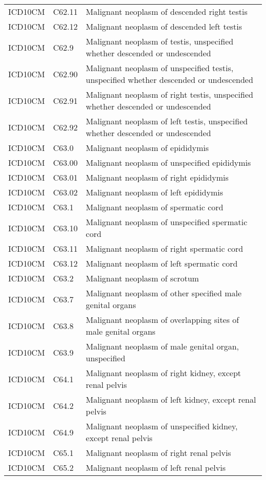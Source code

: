 \begin{longtable}{p{}p{}p{}}
  ICD10CM & C62.11 & Malignant neoplasm of descended right testis \\ 
  ICD10CM & C62.12 & Malignant neoplasm of descended left testis \\ 
  ICD10CM & C62.9 & Malignant neoplasm of testis, unspecified whether descended or undescended \\ 
  ICD10CM & C62.90 & Malignant neoplasm of unspecified testis, unspecified whether descended or undescended \\ 
  ICD10CM & C62.91 & Malignant neoplasm of right testis, unspecified whether descended or undescended \\ 
  ICD10CM & C62.92 & Malignant neoplasm of left testis, unspecified whether descended or undescended \\ 
  ICD10CM & C63.0 & Malignant neoplasm of epididymis \\ 
  ICD10CM & C63.00 & Malignant neoplasm of unspecified epididymis \\ 
  ICD10CM & C63.01 & Malignant neoplasm of right epididymis \\ 
  ICD10CM & C63.02 & Malignant neoplasm of left epididymis \\ 
  ICD10CM & C63.1 & Malignant neoplasm of spermatic cord \\ 
  ICD10CM & C63.10 & Malignant neoplasm of unspecified spermatic cord \\ 
  ICD10CM & C63.11 & Malignant neoplasm of right spermatic cord \\ 
  ICD10CM & C63.12 & Malignant neoplasm of left spermatic cord \\ 
  ICD10CM & C63.2 & Malignant neoplasm of scrotum \\ 
  ICD10CM & C63.7 & Malignant neoplasm of other specified male genital organs \\ 
  ICD10CM & C63.8 & Malignant neoplasm of overlapping sites of male genital organs \\ 
  ICD10CM & C63.9 & Malignant neoplasm of male genital organ, unspecified \\ 
  ICD10CM & C64.1 & Malignant neoplasm of right kidney, except renal pelvis \\ 
  ICD10CM & C64.2 & Malignant neoplasm of left kidney, except renal pelvis \\ 
  ICD10CM & C64.9 & Malignant neoplasm of unspecified kidney, except renal pelvis \\ 
  ICD10CM & C65.1 & Malignant neoplasm of right renal pelvis \\ 
  ICD10CM & C65.2 & Malignant neoplasm of left renal pelvis \\ 

\end{longtable}

